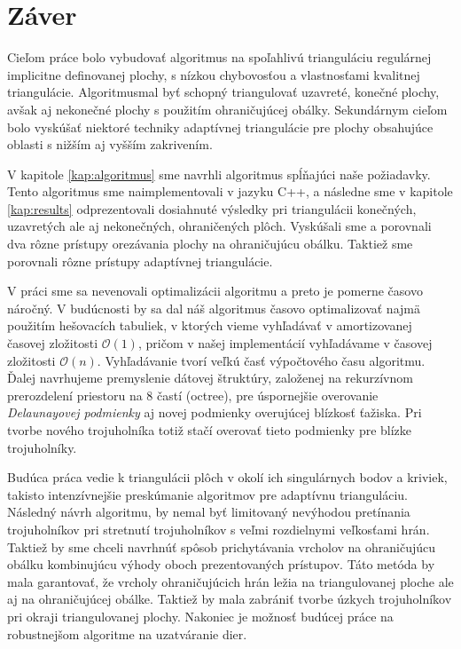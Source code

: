 \chapter*{Záver}  %

Cieľom práce bolo vybudovať algoritmus na spoľahlivú trianguláciu regulárnej implicitne definovanej plochy, 
s nízkou chybovosťou a vlastnosťami kvalitnej triangulácie. Algoritmusmal byť schopný triangulovať
uzavreté, konečné plochy, avšak aj nekonečné plochy s použitím ohraničujúcej obálky. Sekundárnym cieľom bolo
vyskúšať niektoré techniky adaptívnej triangulácie pre plochy obsahujúce oblasti s nižším aj vyšším zakrivením.

V kapitole \ref{kap:algoritmus} sme navrhli algoritmus spĺňajúci naše požiadavky. Tento algoritmus sme
naimplementovali v jazyku C++, a následne sme v kapitole \ref{kap:results} odprezentovali dosiahnuté výsledky
pri triangulácii konečných, uzavretých ale aj nekonečných, ohraničených plôch. Vyskúšali sme a porovnali dva 
rôzne prístupy orezávania plochy na ohraničujúcu obálku. Taktiež sme porovnali rôzne prístupy adaptívnej 
triangulácie. 

V práci sme sa nevenovali optimalizácii algoritmu a preto je pomerne časovo náročný. V budúcnosti by 
sa dal náš algoritmus časovo optimalizovať najmä použitím hešovacích tabuliek, v ktorých vieme vyhľadávať 
v amortizovanej časovej zložitosti $\mathcal{O}(1)$, pričom v našej implementácií vyhľadávame v časovej
zložitosti $\mathcal{O}(n)$. Vyhľadávanie tvorí veľkú časť výpočtového času algoritmu. Ďalej navrhujeme 
premyslenie dátovej štruktúry, založenej na rekurzívnom prerozdelení priestoru na 8 častí (octree), pre 
úspornejšie overovanie \textit{Delaunayovej podmienky} aj novej podmienky overujúcej blízkosť ťažiska.
Pri tvorbe nového trojuholníka totiž stačí overovať tieto podmienky pre blízke trojuholníky.

Budúca práca vedie k triangulácii plôch v okolí ich singulárnych bodov a kriviek, takisto intenzívnejšie 
preskúmanie algoritmov pre adaptívnu trianguláciu. Následný návrh algoritmu, by nemal byť limitovaný nevýhodou pretínania
trojuholníkov pri stretnutí trojuholníkov s veľmi rozdielnymi veľkosťami hrán. Taktiež by sme chceli navrhnúť spôsob 
prichytávania vrcholov na ohraničujúcu obálku kombinujúcu výhody oboch prezentovaných prístupov. Táto metóda by mala 
garantovať, že vrcholy ohraničujúcich hrán ležia na triangulovanej ploche ale aj na ohraničujúcej obálke. Taktiež 
by mala zabrániť tvorbe úzkych trojuholníkov pri okraji triangulovanej plochy.
Nakoniec je možnosť budúcej práce na robustnejšom algoritme na uzatváranie dier.